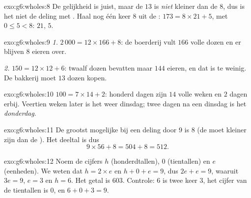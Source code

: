 \begin{solution}{exo:g6:wholes:8}
De gelijkheid is juist, maar de  $13$ is \emph{niet} kleiner dan de 
$8$, dus is het niet de deling met . Haal nog één keer $8$ uit de :
$173 = 8 \times 21 + 5$, met $0 \leq 5 < 8$:  $21$,  $5$.
\end{solution}

\begin{solution}{exo:g6:wholes:9}
\emph{1.} $2\,000 = 12 \times 166 + 8$: de boerderij vult $166$ volle dozen en
er blijven $8$ eieren over.

\emph{2.} $150 = 12 \times 12 + 6$: twaalf dozen bevatten maar $144$ eieren,
en dat is te weinig. De bakkerij moet $13$ dozen kopen.
\end{solution}

\begin{solution}{exo:g6:wholes:10}
$100 = 7 \times 14 + 2$: honderd dagen zijn $14$ volle weken en $2$ dagen
erbij. Veertien weken later is het weer dinsdag; twee dagen na een dinsdag is
het \emph{donderdag}.
\end{solution}

\begin{solution}{exo:g6:wholes:11}
De grootst mogelijke  bij een deling door $9$ is $8$ (de  moet kleiner
zijn dan de ). Het deeltal is dus
\[
9 \times 56 + 8 = 504 + 8 = 512 .
\]
\end{solution}

\begin{solution}{exo:g6:wholes:12}
Noem de cijfers $h$ (honderdtallen), $0$ (tientallen) en $e$ (eenheden). We
weten dat $h = 2 \times e$ en $h + 0 + e = 9$, dus $2e + e = 9$, waaruit
$3e = 9$, $e = 3$ en $h = 6$. Het getal is $603$. Controle: $6$ is twee keer
$3$, het cijfer van de tientallen is $0$, en $6 + 0 + 3 = 9$.
\end{solution}

